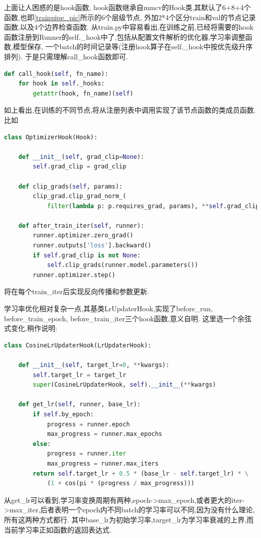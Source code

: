 \documentclass[UTF8]{ctexart}
\begin{document}
上面让人困惑的是hook函数,
hook函数继承自mmcv的Hook类,其默认了6+8+4个函数,也即\ref{trainpipe_pic}所示的6个层级节点,
外加2*4个区分train和val的节点记录函数,以及4个边界检查函数.
从train.py中容易看出,在训练之前,已经将需要的hook函数注册到Runner的self.\_hook中了,包括从配置文件解析的优化器,学习率调整函数,模型保存,
一个batch的时间记录等(注册hook算子在self.\_hook中按优先级升序排列).
于是只需理解call\_hook函数即可.
\lstset{style=mystyle}
\begin{lstlisting}[language=Python]
def call_hook(self, fn_name):
	for hook in self._hooks:
		getattr(hook, fn_name)(self)
\end{lstlisting}

如上看出,在训练的不同节点,将从注册列表中调用实现了该节点函数的类成员函数.比如
\lstset{style=mystyle}
\begin{lstlisting}[language=Python]
class OptimizerHook(Hook):

    def __init__(self, grad_clip=None):
        self.grad_clip = grad_clip

    def clip_grads(self, params):
        clip_grad.clip_grad_norm_(
            filter(lambda p: p.requires_grad, params), **self.grad_clip)

    def after_train_iter(self, runner):
        runner.optimizer.zero_grad()
        runner.outputs['loss'].backward()
        if self.grad_clip is not None:
            self.clip_grads(runner.model.parameters())
        runner.optimizer.step()
\end{lstlisting}
将在每个train\_iter后实现反向传播和参数更新.

学习率优化相对复杂一点,其基类LrUpdaterHook,实现了before\_run, before\_train\_epoch, before\_train\_iter三个hook函数,意义自明.
这里选一个余弦式变化,稍作说明:

\lstset{style=mystyle}
\begin{lstlisting}[language=Python]
class CosineLrUpdaterHook(LrUpdaterHook):

    def __init__(self, target_lr=0, **kwargs):
        self.target_lr = target_lr
        super(CosineLrUpdaterHook, self).__init__(**kwargs)

    def get_lr(self, runner, base_lr):
        if self.by_epoch:
            progress = runner.epoch
            max_progress = runner.max_epochs
        else:
            progress = runner.iter
            max_progress = runner.max_iters
        return self.target_lr + 0.5 * (base_lr - self.target_lr) * \
			(1 + cos(pi * (progress / max_progress)))
\end{lstlisting}
从get\_lr可以看到,学习率变换周期有两种,epoch->max\_epoch,或者更大的iter->max\_iter,后者表明一个epoch内不同batch的学习率可以不同,因为没有什么理论,所有这两种方式都行.
其中base\_lr为初始学习率,target\_lr为学习率衰减的上界,而当前学习率正如函数的返回表达式.
\end{document}
